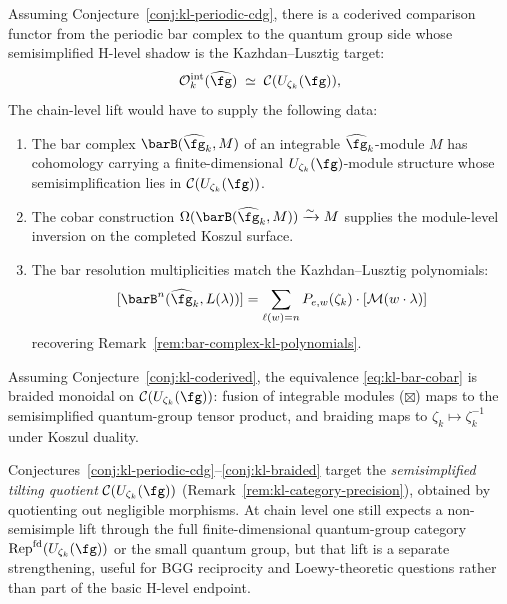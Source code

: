 \begin{conjecture}\label{conj:kl-coderived}
Assuming Conjecture~\textup{\ref{conj:kl-periodic-cdg}}, there is a
coderived comparison functor from the periodic bar complex to the
quantum group side whose semisimplified H-level shadow is the
Kazhdan--Lusztig target:
\begin{equation}\label{eq:kl-bar-cobar}
\mathcal{O}_k^{\mathrm{int}}(\widehat{\fg})
\;\simeq\;
\mathcal{C}(U_{\zeta_k}(\fg)),
\end{equation}
The chain-level lift would have to supply the following data:
\begin{enumerate}[label=\textup{(\roman*)}]
\item The bar complex $\barB(\widehat{\fg}_k, M)$ of an integrable
 $\widehat{\fg}_k$-module $M$ has cohomology carrying a finite-dimensional
 $U_{\zeta_k}(\fg)$-module structure whose semisimplification lies in
 $\mathcal{C}(U_{\zeta_k}(\fg))$.
\item The cobar construction $\Omega(\barB(\widehat{\fg}_k, M))
 \xrightarrow{\sim} M$ supplies the module-level inversion on the
 completed Koszul surface.
\item The bar resolution multiplicities match the Kazhdan--Lusztig
 polynomials:
 \begin{equation}\label{eq:bar-kl-poly}
 [\barB^n(\widehat{\fg}_k, L(\lambda))]
 = \sum_{\ell(w) = n} P_{e,w}(\zeta_k) \cdot [\mathcal{M}(w \cdot \lambda)]
 \end{equation}
 recovering Remark~\textup{\ref{rem:bar-complex-kl-polynomials}}.
\end{enumerate}
\end{conjecture}

\begin{conjecture}\label{conj:kl-braided}
Assuming Conjecture~\textup{\ref{conj:kl-coderived}}, the equivalence
\eqref{eq:kl-bar-cobar} is braided monoidal on
$\mathcal{C}(U_{\zeta_k}(\fg))$: fusion of integrable
modules ($\boxtimes$) maps to the semisimplified quantum-group tensor
product, and braiding maps to
\(\zeta_k \mapsto \zeta_k^{-1}\) under Koszul duality.
\end{conjecture}

\begin{remark}\label{rem:kl-conjecture-target}
Conjectures~\ref{conj:kl-periodic-cdg}--\ref{conj:kl-braided} target
the \emph{semisimplified tilting quotient}
$\mathcal{C}(U_{\zeta_k}(\fg))$ (Remark~\ref{rem:kl-category-precision}),
obtained by quotienting out negligible morphisms.
At chain level one still expects a non-semisimple lift through the
full finite-dimensional quantum-group category
$\mathrm{Rep}^{\mathrm{fd}}(U_{\zeta_k}(\fg))$ or the small quantum group,
but that lift is a separate strengthening, useful for BGG reciprocity
and Loewy-theoretic questions rather than part of the basic H-level
endpoint.
\end{remark}

